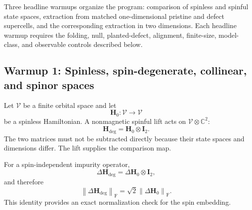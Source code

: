 Three headline warmups organize the program: comparison of spinless and
spinful state spaces, extraction from matched one-dimensional pristine and
defect supercells, and the corresponding extraction in two dimensions. Each
headline warmup requires the folding, null, planted-defect, alignment,
finite-size, model-class, and observable controls described below.

\subsection*{Warmup 1: Spinless, spin-degenerate, collinear, and spinor spaces}

Let $\mathcal V$ be a finite orbital space and let
\begin{equation}
    \mathbf H_0:\mathcal V\longrightarrow\mathcal V
\end{equation}
be a spinless Hamiltonian. A nonmagnetic spinful lift acts on
$\mathcal V\otimes\mathbb C^2$:
\begin{equation}
    \mathbf H_{\mathrm{deg}}
    =
    \mathbf H_0\otimes\mathbf I_2.
\end{equation}
The two matrices must not be subtracted directly because their state spaces and
dimensions differ. The lift supplies the comparison map.

For a spin-independent impurity operator,
\begin{equation}
    \Delta\mathbf H_{\mathrm{deg}}
    =
    \Delta\mathbf H_0\otimes\mathbf I_2,
\end{equation}
and therefore
\begin{equation}
    \left\lVert
        \Delta\mathbf H_{\mathrm{deg}}
    \right\rVert_{\mathrm F}
    =
    \sqrt{2}
    \left\lVert
        \Delta\mathbf H_0
    \right\rVert_{\mathrm F}.
\end{equation}
This identity provides an exact normalization check for the spin embedding.


